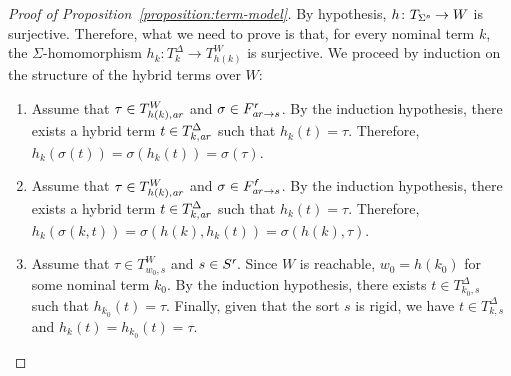 \documentclass[a4paper,UKenglish,cleveref, autoref]{lipics-v2019}
\newcommand{\keyscript}[1]{\text{\normalfont\sffamily\itshape #1}}
\newcommand{\ari}{\mathit{a\mkern -1mu r}}
\newcommand{\nominal}{\keyscript{n}}
\newcommand{\rigid}{\keyscript{r}}
\newcommand{\flexible}{\keyscript{f}}
\begin{document}
\begin{proof}[Proof of Proposition~\ref{proposition:term-model}]
  By hypothesis, \(h \colon T_{\Sigma^{\nominal}} \to W\) is surjective.
  Therefore, what we need to prove is that, for every nominal term \(k\), the \(\Sigma\)-homomorphism \(h_{k} \colon T^{\Delta}_{k} \to T^{W}_{h(k)}\) is surjective.
  We proceed by induction on the structure of the hybrid terms over \(W\):
  \begin{enumerate}
  \item Assume that \(\tau \in T^{W}_{h(k),\ari}\) and \(\sigma \in F^{\rigid}_{\ari \to s}\).
    By the induction hypothesis, there exists a hybrid term \(t \in T^{\Delta}_{k,\ari}\) such that \(h_{k}(t) = \tau\).
    Therefore, \(h_{k}(\sigma(t)) = \sigma(h_{k}(t)) = \sigma(\tau)\).

  \item Assume that \(\tau \in T^{W}_{h(k),\ari}\) and \(\sigma \in F^{\flexible}_{\ari \to s}\).
    By the induction hypothesis, there exists a hybrid term \(t \in T^{\Delta}_{k,\ari}\) such that \(h_{k}(t) = \tau\).
    Therefore, \(h_{k}(\sigma(k, t)) = \sigma(h(k), h_{k}(t)) = \sigma(h(k), \tau)\).

  \item Assume that \(\tau \in T^{W}_{w_{0},s}\) and \(s \in S^{\rigid}\).
    Since \(W\) is reachable, \(w_{0} = h(k_{0})\) for some nominal term \(k_{0}\).
    By the induction hypothesis, there exists \(t \in T^{\Delta}_{k_{0},s}\) such that \(h_{k_{0}}(t) = \tau\).
    Finally, given that the sort \(s\) is rigid, we have \(t \in T^{\Delta}_{k, s}\) and \(h_{k}(t) = h_{k_{0}}(t) = \tau\).
    \qedhere
  \end{enumerate}
\end{proof}
\end{document}
